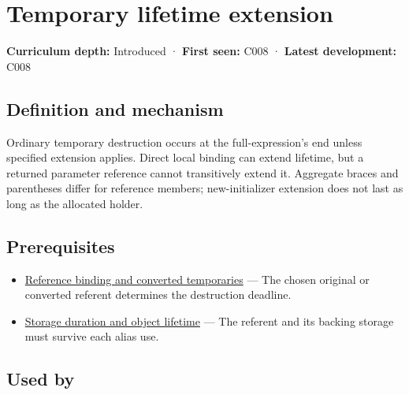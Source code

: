 \hypertarget{appendix-a978b29bbbb0}{}\label{referencestart:appendix-a978b29bbbb0}
\section{Temporary lifetime extension}\label{appendix-a978b29bbbb0-temporary-lifetime-extension}

\hypertarget{appendix-a978b29bbbb0-temporary-lifetime-extension}{}

\textbf{Curriculum depth:} Introduced · \textbf{First seen:} C008 · \textbf{Latest development:} C008

\begin{allmightroledefinition}

\subsection{Definition and mechanism}\label{appendix-a978b29bbbb0-definition-and-mechanism}

\hypertarget{appendix-a978b29bbbb0-definition-and-mechanism}{}

Ordinary temporary destruction occurs at the full-expression's end unless specified extension applies. Direct local binding can extend lifetime, but a returned parameter reference cannot transitively extend it. Aggregate braces and parentheses differ for reference members; new-initializer extension does not last as long as the allocated holder.

\end{allmightroledefinition}

\subsection{Prerequisites}\label{appendix-a978b29bbbb0-prerequisites}

\hypertarget{appendix-a978b29bbbb0-prerequisites}{}

\begin{itemize}
\tightlist
\item
  \hyperref[appendix-37856d997bb0]{Reference binding and converted temporaries} --- The chosen original or converted referent determines the destruction deadline.
\item
  \hyperref[appendix-0b104bcba06b]{Storage duration and object lifetime} --- The referent and its backing storage must survive each alias use.
\end{itemize}

\subsection{Used by}\label{appendix-a978b29bbbb0-used-by}

